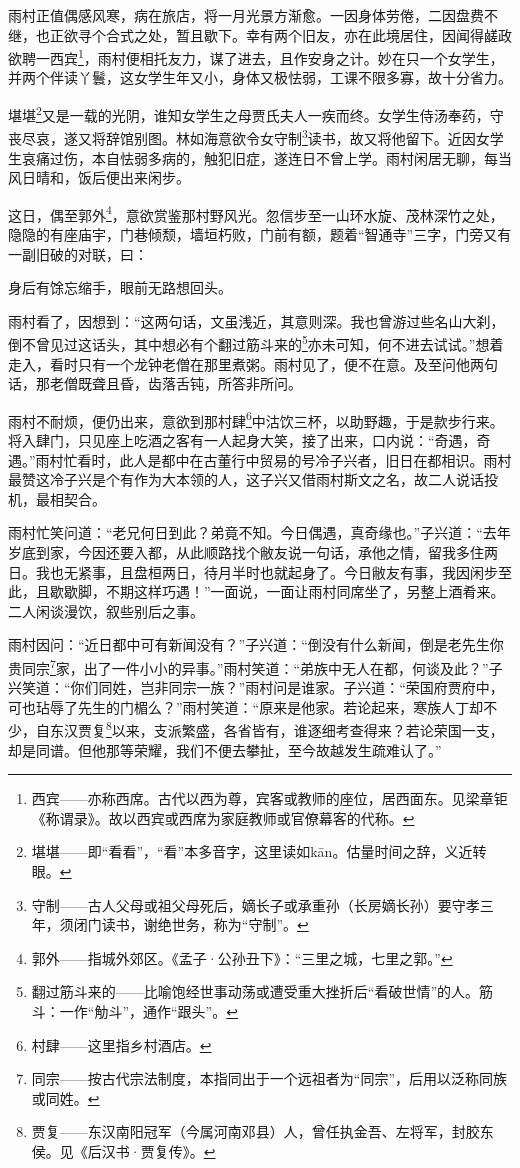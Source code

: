 \par 雨村正值偶感风寒，病在旅店，将一月光景方渐愈。一因身体劳倦，二因盘费不继，也正欲寻个合式之处，暂且歇下。幸有两个旧友，亦在此境居住，因闻得鹾政欲聘一西宾\footnote{西宾——亦称西席。古代以西为尊，宾客或教师的座位，居西面东。见梁章钜《称谓录》。故以西宾或西席为家庭教师或官僚幕客的代称。}，雨村便相托友力，谋了进去，且作安身之计。妙在只一个女学生，并两个伴读丫鬟，这女学生年又小，身体又极怯弱，工课不限多寡，故十分省力。
\par 堪堪\footnote{堪堪——即“看看”，“看”本多音字，这里读如kān。估量时间之辞，义近转眼。}又是一载的光阴，谁知女学生之母贾氏夫人一疾而终。女学生侍汤奉药，守丧尽哀，遂又将辞馆别图。林如海意欲令女守制\footnote{守制——古人父母或祖父母死后，嫡长子或承重孙（长房嫡长孙）要守孝三年，须闭门读书，谢绝世务，称为“守制”。}读书，故又将他留下。近因女学生哀痛过伤，本自怯弱多病的，触犯旧症，遂连日不曾上学。雨村闲居无聊，每当风日晴和，饭后便出来闲步。
\par 这日，偶至郭外\footnote{郭外——指城外郊区。《孟子·公孙丑下》：“三里之城，七里之郭。”}，意欲赏鉴那村野风光。忽信步至一山环水旋、茂林深竹之处，隐隐的有座庙宇，门巷倾颓，墙垣朽败，门前有额，题着“智通寺”三字，门旁又有一副旧破的对联，曰：
\par 身后有馀忘缩手，眼前无路想回头。
\par 雨村看了，因想到：“这两句话，文虽浅近，其意则深。我也曾游过些名山大刹，倒不曾见过这话头，其中想必有个翻过筋斗来的\footnote{翻过筋斗来的——比喻饱经世事动荡或遭受重大挫折后“看破世情”的人。筋斗：一作“觔斗”，通作“跟头”。}亦未可知，何不进去试试。”想着走入，看时只有一个龙钟老僧在那里煮粥。雨村见了，便不在意。及至问他两句话，那老僧既聋且昏，齿落舌钝，所答非所问。
\par 雨村不耐烦，便仍出来，意欲到那村肆\footnote{村肆——这里指乡村酒店。}中沽饮三杯，以助野趣，于是款步行来。将入肆门，只见座上吃酒之客有一人起身大笑，接了出来，口内说：“奇遇，奇遇。”雨村忙看时，此人是都中在古董行中贸易的号冷子兴者，旧日在都相识。雨村最赞这冷子兴是个有作为大本领的人，这子兴又借雨村斯文之名，故二人说话投机，最相契合。
\par 雨村忙笑问道：“老兄何日到此？弟竟不知。今日偶遇，真奇缘也。”子兴道：“去年岁底到家，今因还要入都，从此顺路找个敝友说一句话，承他之情，留我多住两日。我也无紧事，且盘桓两日，待月半时也就起身了。今日敝友有事，我因闲步至此，且歇歇脚，不期这样巧遇！”一面说，一面让雨村同席坐了，另整上酒肴来。二人闲谈漫饮，叙些别后之事。
\par 雨村因问：“近日都中可有新闻没有？”子兴道：“倒没有什么新闻，倒是老先生你贵同宗\footnote{同宗——按古代宗法制度，本指同出于一个远祖者为“同宗”，后用以泛称同族或同姓。}家，出了一件小小的异事。”雨村笑道：“弟族中无人在都，何谈及此？”子兴笑道：“你们同姓，岂非同宗一族？”雨村问是谁家。子兴道：“荣国府贾府中，可也玷辱了先生的门楣么？”雨村笑道：“原来是他家。若论起来，寒族人丁却不少，自东汉贾复\footnote{贾复——东汉南阳冠军（今属河南邓县）人，曾任执金吾、左将军，封胶东侯。见《后汉书·贾复传》。}以来，支派繁盛，各省皆有，谁逐细考查得来？若论荣国一支，却是同谱。但他那等荣耀，我们不便去攀扯，至今故越发生疏难认了。”
